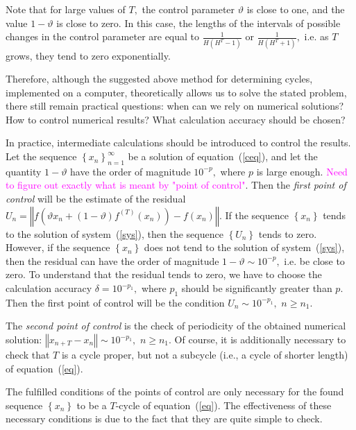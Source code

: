 \documentclass[12pt,a4paper]{amsart}
\begin{document}
Note that for large values of $T,$ the control parameter $\vartheta$ is close to one, and the value $1-\vartheta$ is close to zero. 
In this case, the lengths of the intervals of possible changes in the control parameter are equal to $\frac{1}{H(H^T-1)}$ or
$\frac{1}{H(H^T+1)},$ i.e. as $T$ grows, they tend to zero exponentially. 

Therefore, although the suggested above method for determining cycles, implemented on a computer, theoretically allows us to solve 
the stated problem, there still remain practical questions: when can we rely on numerical solutions? How to control numerical results? 
What calculation accuracy should be chosen?

In practice, intermediate calculations should be introduced to control the results. Let the sequence $\left\{x_n\right\}_{n=1}^{\infty}$ 
be a solution of equation~(\ref{ceq}), and let the quantity $1-\vartheta$ have the order of magnitude $10^{-p},$ where 
$p$ is large enough. \textcolor{magenta}{Need to figure out exactly what is meant by "point of control"}. 
Then the \textit{first point of control} will be the estimate of the residual 
$U_n = \left\Vert f\left( \vartheta x_n + (1 - \vartheta) f^{(T)}(x_n)\right) - f(x_n)\right\Vert.$ If the sequence $\left\{x_n\right\}$ 
tends to the solution of system~(\ref{sys}), then the sequence $\left\{U_n\right\}$ tends to zero. However, if the sequence 
$\left\{x_n\right\}$ does not tend to the solution of system~(\ref{sys}), then the residual can have the order of magnitude 
${1 - \vartheta}\sim 10^{-p},$ i.e. be close to zero. To understand that the residual tends to zero, we have to choose the calculation 
accuracy $\delta=10^{-p_1},$ where $p_1$ should be significantly greater than $p.$ Then the first point of control will be the condition
${U_n}\sim 10^{-p_1},$ $n\geq n_1.$

The \textit{second point of control} is the check of periodicity of the obtained numerical solution: 
$\left\Vert x_{n+T} - x_n\right\Vert \sim 10^{-p_1},$ $n\geq n_1.$ Of course, it is additionally necessary to check that $T$ is a cycle proper, 
but not a subcycle (i.e., a cycle of shorter length) of equation~(\ref{eq}).

The fulfilled conditions of the points of control are only necessary for the found sequence $\left\{x_n\right\}$ to be a $T$-cycle 
of equation~(\ref{eq}). The effectiveness of these necessary conditions is due to the fact that they are quite simple to check.
\end{document}
